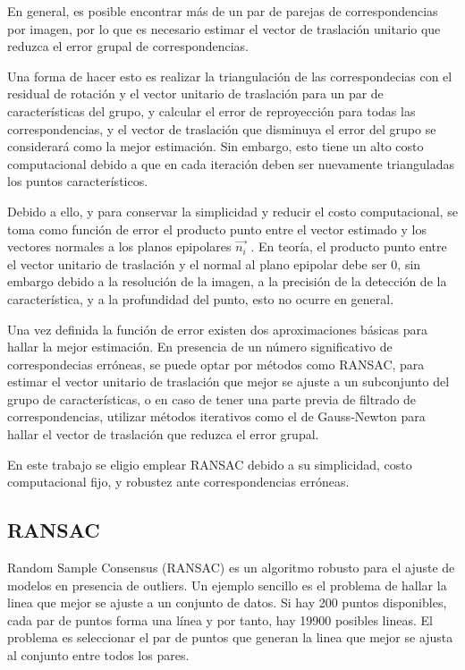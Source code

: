 En general, es posible encontrar más de un par de parejas de correspondencias por imagen, por lo que es necesario estimar el vector de traslación unitario que reduzca el error grupal de correspondencias.

Una forma de hacer esto es realizar la triangulación de las correspondecias con el residual de rotación y  el vector unitario de traslación para un par de características del grupo, y calcular el error de reproyección para todas las correspondencias, y el vector de traslación que disminuya el error del grupo se considerará como la mejor estimación. Sin embargo, esto tiene un alto costo computacional debido a que en cada iteración deben ser nuevamente trianguladas los puntos característicos.

Debido a ello, y para conservar la simplicidad y reducir el costo computacional, se toma como función de error el producto punto entre el vector estimado y los vectores normales a los planos epipolares $\overset { \rightarrow  }{ { n }_{ i } } $ . En teoría, el producto punto entre el vector unitario de traslación y el normal al plano epipolar debe ser $0$, sin embargo debido a la resolución de la imagen, a la precisión de la detección de la característica, y a la profundidad del punto, esto no ocurre en general.

Una vez definida la función de error existen dos aproximaciones básicas para hallar la mejor estimación.
En presencia de un número significativo de correspondecias erróneas, se puede optar por métodos como RANSAC, para estimar el vector unitario de traslación que mejor se ajuste a un subconjunto del grupo de características, o en caso de tener una parte previa de filtrado de correspondencias, utilizar métodos iterativos como el de Gauss-Newton para hallar el vector de traslación que reduzca el error grupal.

En este trabajo se eligio emplear RANSAC debido a su simplicidad, costo computacional fijo, y robustez ante correspondencias erróneas.

\subsection{RANSAC}

Random Sample Consensus (RANSAC) es un algoritmo robusto para el ajuste de modelos en presencia de outliers. Un ejemplo sencillo es el problema de hallar la linea que mejor se ajuste a un conjunto de datos. Si hay 200 puntos disponibles, cada par de puntos forma una línea y por tanto, hay 19900 posibles lineas. El problema es seleccionar el par de puntos que generan la linea que mejor se ajusta al conjunto entre todos los pares.

